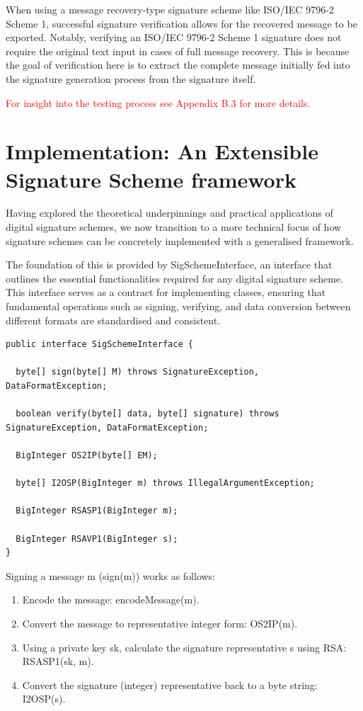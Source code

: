\documentclass[]{final_report}
\theoremstyle{definition}
\begin{document}
When using a message recovery-type signature scheme like ISO\slash IEC 9796-2 Scheme 1, successful signature verification allows for the recovered message to be exported. Notably, verifying an ISO/IEC 9796-2 Scheme 1 signature does not require the original text input in cases of full message recovery. This is because the goal of verification here is to extract the complete message initially fed into the signature generation process from the signature itself.

\textcolor{red} {For insight into the testing process see Appendix B.3 for more details.}

\section{Implementation: An Extensible Signature Scheme framework}
Having explored the theoretical underpinnings and practical applications of digital signature schemes, we now transition to a more technical focus of how signature schemes can be concretely implemented with a generalised framework.

The foundation of this is provided by SigSchemeInterface, an interface that outlines the essential functionalities required for any digital signature scheme. This interface serves as a contract for implementing classes, ensuring that fundamental operations such as signing, verifying, and data conversion between different formats are standardised and consistent.

\begin{lstlisting}[caption=SigSchemeInterface Interface code] 
public interface SigSchemeInterface {

  byte[] sign(byte[] M) throws SignatureException, DataFormatException;

  boolean verify(byte[] data, byte[] signature) throws SignatureException, DataFormatException;

  BigInteger OS2IP(byte[] EM);

  byte[] I2OSP(BigInteger m) throws IllegalArgumentException;

  BigInteger RSASP1(BigInteger m);

  BigInteger RSAVP1(BigInteger s);
}
 \end{lstlisting}

Signing a message m (sign(m)) works as follows:
\begin{enumerate}
\item Encode the message: encodeMessage(m).

\item Convert the message to representative integer form: OS2IP(m).

\item Using a private key sk, calculate the signature representative s using RSA: RSASP1(sk, m).

\item Convert the signature (integer) representative back to a byte string: I2OSP(s).
\end{enumerate}
\end{document}
